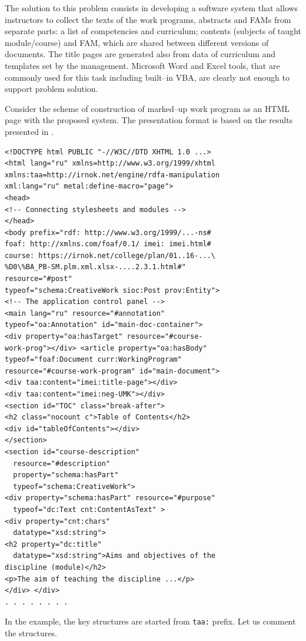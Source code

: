 \documentclass[conference,a4paper]{IEEEtran}
\begin{document}
The solution to this problem consists in developing a software system that allows instructors to collect the texts of the work programs, abstracts and FAMs from separate parts: a list of competencies and curriculum; contents (subjects of taught module/course) and FAM, which are shared between different versions of documents.  The title pages are generated also from data of curriculum and templates set by the management.  Microsoft Word and Excel tools, that are commonly used for this task including built--in VBA, are clearly not enough to support problem solution.

Consider the scheme of construction of marked--up work program as an HTML page with the proposed system.  The presentation format is based on the results presented in \cite{b4,b15}.

\begin{verbatim}
<!DOCTYPE html PUBLIC "-//W3C//DTD XHTML 1.0 ...>
<html lang="ru" xmlns=http://www.w3.org/1999/xhtml
xmlns:taa=http://irnok.net/engine/rdfa-manipulation
xml:lang="ru" metal:define-macro="page">
<head>
<!-- Connecting stylesheets and modules -->
</head>
<body prefix="rdf: http://www.w3.org/1999/...-ns#
foaf: http://xmlns.com/foaf/0.1/ imei: imei.html#
course: https://irnok.net/college/plan/01..16-...\
%D0\%BA_PB-SM.plm.xml.xlsx-....2.3.1.html#"
resource="#post"
typeof="schema:CreativeWork sioc:Post prov:Entity">
<!-- The application control panel -->
<main lang="ru" resource="#annotation"
typeof="oa:Annotation" id="main-doc-container">
<div property="oa:hasTarget" resource="#course-
work-prog"></div> <article property="oa:hasBody"
typeof="foaf:Document curr:WorkingProgram"
resource="#course-work-program" id="main-document">
<div taa:content="imei:title-page"></div>
<div taa:content="imei:neg-UMK"></div>
<section id="TOC" class="break-after">
<h2 class="nocount c">Table of Contents</h2>
<div id="tableOfContents"></div>
</section>
<section id="course-description"
  resource="#description"
  property="schema:hasPart"
  typeof="schema:CreativeWork">
<div property="schema:hasPart" resource="#purpose"
  typeof="dc:Text cnt:ContentAsText" >
<div property="cnt:chars"
  datatype="xsd:string">
<h2 property="dc:title"
  datatype="xsd:string">Aims and objectives of the
discipline (module)</h2>
<p>The aim of teaching the discipline ...</p>
</div> </div>
. . . . . . . .
\end{verbatim}

In the example, the key structures are started from \texttt{taa:} prefix. Let us comment the structures.
\end{document}
